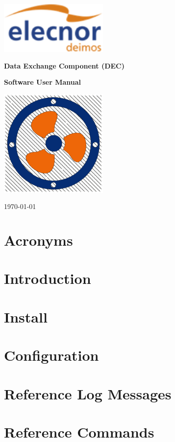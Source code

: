 \documentclass[oneside,openany,a4paper]{book}
\begin{document}

\begin{titlepage}
	\begin{center}
		
		\includegraphics[width=0.4\textwidth]{logo_elecnor_deimos.png}
		
		\vspace*{1cm}
		\Large
		\textbf{Data Exchange Component (DEC)}
		
		\textbf{Software User Manual}
		
		\vspace*{1cm}
		
		\includegraphics[width=0.4\textwidth]{DEC_Logo_White.png}
		
		\vspace{0.8cm}
		
		\today
		
	\end{center}
\end{titlepage}
	


\tableofcontents
\newpage

\chapter{Acronyms}
 
\newpage
 
\chapter{Introduction}

\newpage

\chapter{Install}

 
\chapter{Configuration}


\chapter{Reference Log Messages}


\chapter{Reference Commands}

 
\end{document}
